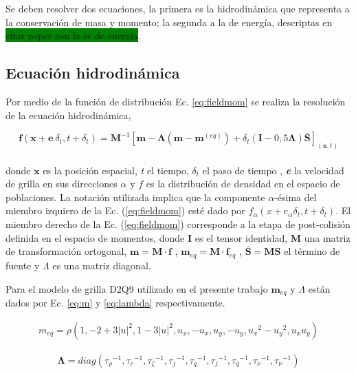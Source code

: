 Se deben resolver dos ecuaciones, la primera es la hidrodinámica que representa a la conservación de masa y momento; la segunda a la de energía, descriptas en \colorbox{green}{citar paper con la ec de energia}.


\subsection{Ecuación hidrodinámica}

Por medio de la función de distribución Ec. \ref{eq:fieldmom} \cite{li2013lattice} se realiza la resolución de la ecuación hidrodinámica,


\begin{equation}
    \mathbf{f}(\mathbf{x} + \mathbf{e} \> \delta_{t} , t + \delta_{t}) = \mathbf{M}^{-1} \left[ \mathbf{m} - \mathbf{\Lambda}(\mathbf{m} - \mathbf{m}^{(eq)}) + \delta_{t} \left( \mathbf{I} - 0,5 \mathbf{\Lambda} \right) \mathbf{\bar{S}}  \right]_{(\mathbf{x},t)} 
    \label{eq:fieldmom}
\end{equation}\\
donde $\mathbf{x}$ es la posición espacial, \textit{t} el tiempo, $\delta_{t}$ el paso de tiempo , \textit{\textbf{e}} la velocidad de grilla en sus direcciones $\alpha$ y $\textit{f}$ es la distribución de densidad en el espacio de poblaciones. La notación utilizada implica que la componente $\alpha$-ésima del miembro izquiero de la Ec. (\ref{eq:fieldmom}) esté dado por $f_{\alpha}(x + e_{\alpha} \delta_{t}  , t + \delta_{t} )$. El miembro derecho de la Ec. (\ref{eq:fieldmom}) corresponde a la etapa de post-colisión definida en el espacio de momentos, donde \textbf{I} es el tensor identidad, \textbf{M} una matriz de transformación ortogonal, $\mathbf{m} = \mathbf{M} \cdot \mathbf{f}$ , $\mathbf{m}_{eq} = \mathbf{M} \cdot \mathbf{f}_{eq}$ , $\mathbf{\bar{S}} = \mathbf{M} \mathbf{S}$ el término de fuente y $ \Lambda$ es una matriz diagonal.

Para el modelo de grilla D2Q9 utilizado en el presente trabajo $\mathbf{m}_{eq}$ y $ \Lambda$ están dados por Ec. \ref{eq:m} y \ref{eq:lambda} respectivamente.

\begin{align}
m_{eq} =  \rho  \left( 1, - 2 + 3 {|u|}^{2} , 1 - 3{|u|}^{2} , u_{x} , - u_{x} , u_{y} , - u_{y} , {u_{x}}^{2} - {u_{y}}^{2} , u_{x} u_{y} \right) 
\label{eq:m}
\end{align}

    
\begin{align}
    \mathbf{\Lambda}  = diag ( {\tau_{\rho }}^{-1},{\tau_{e}}^{-1},{\tau_{\zeta }}^{-1},{\tau_{j}}^{-1},{\tau_{q}}^{-1},{\tau_{j}}^{-1},{\tau_{q}}^{-1},{\tau_{\nu }}^{-1},{\tau_{\nu}}^{-1}) 
    \label{eq:lambda}
\end{align}


